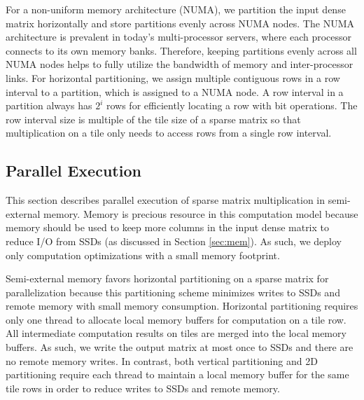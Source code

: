 For a non-uniform memory architecture (NUMA), we partition the input dense matrix
horizontally and store partitions evenly across NUMA nodes. The NUMA architecture
is prevalent in today's multi-processor servers, where each processor connects
to its own memory banks. Therefore, keeping partitions evenly across all NUMA
nodes helps to fully utilize the bandwidth of memory and inter-processor links.
For horizontal partitioning, we assign multiple contiguous rows in a row
interval to a partition, which is assigned to a NUMA node. A row interval
in a partition always has $2^i$ rows for efficiently locating a row
with bit operations. The row interval size is multiple of the tile size of
a sparse matrix so that multiplication on a tile only needs to access rows
from a single row interval.


\subsection{Parallel Execution} \label{sec:exec}
This section describes parallel execution of sparse matrix multiplication
in semi-external memory. Memory is precious resource in this computation model
because memory should be used to keep more columns in the input dense matrix
to reduce I/O from SSDs (as discussed in Section \ref{sec:mem}).
As such, we deploy only computation optimizations with a small memory footprint.

Semi-external memory favors horizontal partitioning on a sparse matrix
for parallelization because this partitioning scheme minimizes writes to SSDs
and remote memory with small memory consumption. Horizontal partitioning
requires only one thread to allocate local memory buffers for computation on
a tile row. All intermediate computation results on tiles are merged into
the local memory buffers. As such, we write the output matrix at most once
to SSDs and there are no remote memory writes.
In contrast, both vertical partitioning and 2D partitioning require each
thread to maintain a local memory buffer for the same tile rows in order
to reduce writes to SSDs and remote memory.

